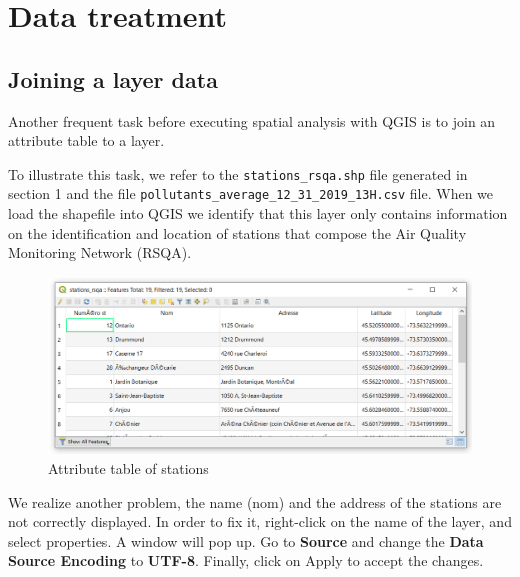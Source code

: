 \documentclass[]{book}
\theoremstyle{definition}
\theoremstyle{definition}
\theoremstyle{definition}
\theoremstyle{remark}
\begin{document}
\chapter{Data treatment}\label{data-treatment}

\section{Joining a layer data}\label{joining-a-layer-data}

Another frequent task before executing spatial analysis with QGIS is to
join an attribute table to a layer.

To illustrate this task, we refer to the \texttt{stations\_rsqa.shp}
file generated in section 1 and the file
\texttt{pollutants\_average\_12\_31\_2019\_13H.csv} file. When we load
the shapefile into QGIS we identify that this layer only contains
information on the identification and location of stations that compose
the Air Quality Monitoring Network (RSQA).

\begin{figure}

{\centering \includegraphics[width=15.43in]{figures/Change_Encoding} 

}

\caption{Attribute table of stations}\label{fig:unnamed-chunk-12}
\end{figure}

We realize another problem, the name (nom) and the address of the
stations are not correctly displayed. In order to fix it, right-click on
the name of the layer, and select properties. A window will pop up. Go
to \textbf{Source} and change the \textbf{Data Source Encoding} to
\textbf{UTF-8}. Finally, click on Apply to accept the changes.
\end{document}
